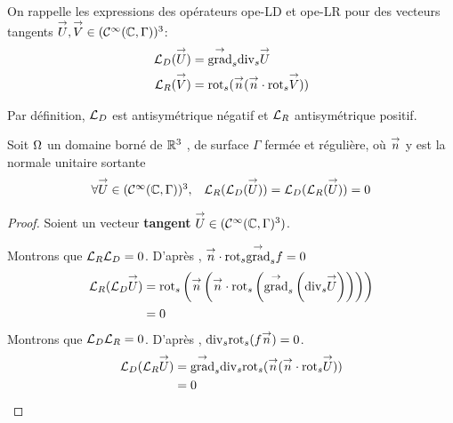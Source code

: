   \begin{defn}
    On rappelle les expressions des opérateurs \gls{ope-LD} et \gls{ope-LR} pour des vecteurs tangents \(\vect U,\vect V \in (\mathcal{C}^\infty(\CC,\Gamma))^3\): 
    \begin{align*}
      \LD(\vect U) &= \tgrads \tdivs \vect U\\
      \LR(\vect V) &= \trots( \vn ( \vn \cdot \trots \vect V))\\
    \end{align*}
  \end{defn}

  \begin{prop}
    Par définition, \(\LD\) est antisymétrique négatif et \(\LR\) antisymétrique positif.
  \end{prop}

  \begin{prop}
    Soit \(\OO\) un domaine borné de \(\RR^3\) , de surface \(\Gamma\) fermée et régulière, où \(\vect n\) y est la normale unitaire
    sortante
    \begin{equation}
      \begin{matrix}
        \forall \vect U \in (\mathcal{C}^\infty(\CC,\Gamma))^3 ,& \LR(\LD(\vect U)) = \LD(\LR(\vect U)) = 0
      \end{matrix}
    \end{equation}
  \end{prop}
  \begin{proof}

    Soient un vecteur \textbf{tangent} \(\vect U \in (\mathcal{C}^\infty(\CC,\Gamma)^3)\). 

    Montrons que \(\LR\LD = 0\).
    D’après \cite[p.~1029, A3.42]{bladel_electromagnetic_2007}, \(\vn \cdot \trots\tgrads f = 0\)
    \begin{align*}
      \LR(\LD \vect U)  &= \trots \left(\vn \left(\vn \cdot \trots \left( \tgrads \left(\tdivs \vect U\right)\right)\right)\right) \\
      &= 0
    \end{align*}
    Montrons que \(\LD\LR = 0\).
    D’après \cite[p.~1029, A3.43]{bladel_electromagnetic_2007}, \(\tdivs \trots (f\vn) = 0\).
    \begin{align*}
      \LD(\LR \vect U) &= \tgrads \tdivs \trots (\vn (\vn \cdot \trots \vect U)) \\
      &= 0
    \end{align*}
  \end{proof}

